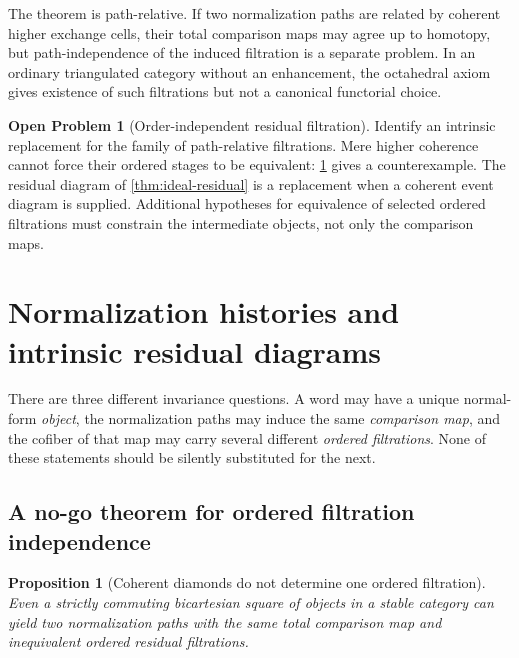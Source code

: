\documentclass[11pt]{article}
\newtheorem{proposition}[theorem]{Proposition}
\theoremstyle{definition}
\newtheorem{problem}[theorem]{Open Problem}
\theoremstyle{remark}
\begin{document}
The theorem is path-relative. If two normalization paths are related by coherent higher exchange cells, their total comparison maps may agree up to homotopy, but path-independence of the induced filtration is a separate problem. In an ordinary triangulated category without an enhancement, the octahedral axiom gives existence of such filtrations but not a canonical functorial choice.

\begin{problem}[Order-independent residual filtration]\label{prob:path-independent}
Identify an intrinsic replacement for the family of path-relative filtrations. Mere higher coherence cannot force their ordered stages to be equivalent: \cref{prop:filtration-no-go} gives a counterexample. The residual diagram of \cref{thm:ideal-residual} is a replacement when a coherent event diagram is supplied. Additional hypotheses for equivalence of selected ordered filtrations must constrain the intermediate objects, not only the comparison maps.
\end{problem}

\section{Normalization histories and intrinsic residual diagrams}\label{sec:histories}

There are three different invariance questions. A word may have a unique normal-form \emph{object}, the normalization paths may induce the same \emph{comparison map}, and the cofiber of that map may carry several different \emph{ordered filtrations}. None of these statements should be silently substituted for the next.

\subsection{A no-go theorem for ordered filtration independence}

\begin{proposition}[Coherent diamonds do not determine one ordered filtration]\label{prop:filtration-no-go}
Even a strictly commuting bicartesian square of objects in a stable category can yield two normalization paths with the same total comparison map and inequivalent ordered residual filtrations.
\end{proposition}
\end{document}
